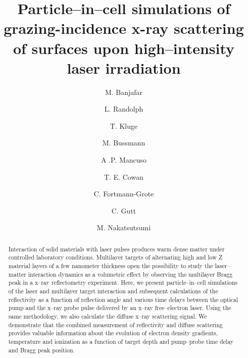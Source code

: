\documentclass[preprint, 12pt]{elsarticle}
\begin{document}
\begin{frontmatter}



\title{Particle--in--cell simulations of grazing-incidence x-ray scattering of
surfaces upon high--intensity laser irradiation}





\author[1]{M. Banjafar}
\author[2]{L. Randolph}
\author[3]{T. Kluge}
\author[3]{M. Bussmann}
\author[1]{A .P. Mancuso}
\author[3]{T. E. Cowan}
\author[1]{C. Fortmann-Grote}
\author[2]{C. Gutt}
\author[1]{M. Nakatsutsumi}
%
\address[1]{European XFEL GmbH, Holzkopple 4, 22869 Schenefeld, Germany}
\address[2]{Department of Physics, University of Siegen, D-57072 Siegen, Germany}
\address[3]{Helmholtz-Zentrum Dresden-Rossendorf, Bautzner Landstraße 400, 01328 Dresden, Germany}

\begin{abstract}
  Interaction of solid materials with laser pulses
  produces warm dense matter under controlled laboratory conditions.
  Multilayer targets of alternating high and low Z material layers of a few
  nanometer thickness open the possibility
  to study the laser--matter interaction dynamics as a volumetric effect by
  observing the multilayer Bragg peak in a x--ray reflectometry experiment.
  Here, we present particle--in--cell simulations of
  the laser and multilayer target interaction and subsequent calculations of
  the reflectivity as a
  function of reflection angle and various time delays between the optical pump
  and the x--ray probe pulse delivered by an x--ray free--electron laser.
  Using the same methodology, we also calculate the diffuse x--ray scattering
  signal.
  We demonstrate that the combined measurement of reflectivity and
  diffuse scattering provides valuable information about the evolution of
  electron density gradients, temperature and ionization as a function of target
  depth and pump--probe time delay and Bragg peak position.
\end{abstract}


\end{frontmatter}
\end{document}

